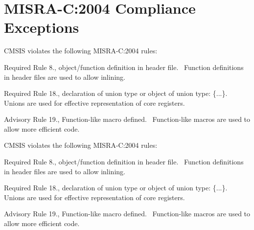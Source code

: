\chapter{MISRA-\/C\+:2004 Compliance Exceptions }
\hypertarget{_c_m_s_i_s__m_i_s_r_a__exceptions}{}\label{_c_m_s_i_s__m_i_s_r_a__exceptions}
CMSIS violates the following MISRA-\/C\+:2004 rules\+:

\begin{DoxyItemize}
\item Required Rule 8., object/function definition in header file.~\newline
 Function definitions in header files are used to allow \textquotesingle{}inlining\textquotesingle{}.\end{DoxyItemize}
\begin{DoxyItemize}
\item Required Rule 18., declaration of union type or object of union type\+: \textquotesingle{}\{...\}\textquotesingle{}.~\newline
 Unions are used for effective representation of core registers.\end{DoxyItemize}
\begin{DoxyItemize}
\item Advisory Rule 19., Function-\/like macro defined.~\newline
 Function-\/like macros are used to allow more efficient code.\end{DoxyItemize}


CMSIS violates the following MISRA-\/C\+:2004 rules\+:

\begin{DoxyItemize}
\item Required Rule 8., object/function definition in header file.~\newline
 Function definitions in header files are used to allow \textquotesingle{}inlining\textquotesingle{}.\end{DoxyItemize}
\begin{DoxyItemize}
\item Required Rule 18., declaration of union type or object of union type\+: \textquotesingle{}\{...\}\textquotesingle{}.~\newline
 Unions are used for effective representation of core registers.\end{DoxyItemize}
\begin{DoxyItemize}
\item Advisory Rule 19., Function-\/like macro defined.~\newline
 Function-\/like macros are used to allow more efficient code. \end{DoxyItemize}
